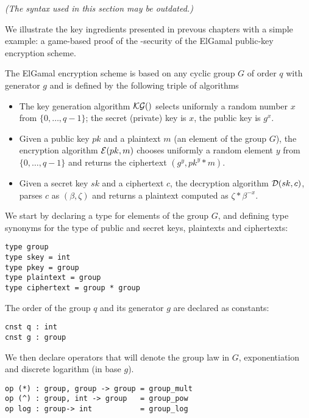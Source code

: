 \begin{flushright}
\it (The syntax used in this section may be outdated.)
\end{flushright}

We illustrate the key ingredients presented in prevous chapters with a
simple example: a game-based proof of the \INDCPA-security of the
ElGamal public-key encryption scheme.

The ElGamal encryption scheme is based on any cyclic group $G$ of
order $q$ with generator $g$ and is defined by the following triple of
algorithms

\begin{itemize} 
\item The key generation algorithm $\mathcal{KG}()$ selects uniformly a random
      number $x$ from $\{0,\ldots,q-1\}$; the secret (private) key is
      $x$, the public key is $g^x$.

\item Given a public key $pk$ and a plaintext $m$ (an element of the
      group $G$), the encryption algorithm $\mathcal{E}(pk, m)$ chooses
      uniformly a random element $y$ from $\{0,\ldots,q-1\}$ and
      returns the ciphertext $(g^y, pk^y * m)$.

\item Given a secret key $sk$ and a ciphertext $c$, 
      the decryption algorithm $\mathcal{D}(sk, c)$, parses $c$ as
      $(\beta,\zeta)$ and returns a plaintext computed as
      $\zeta * \beta^{-x}$.
\end{itemize}

We start by declaring a type for elements of the group $G$, and
defining type synonyms for the type of public and secret keys,
plaintexts and ciphertexts:
%
\begin{verbatim} 
type group 
type skey = int 
type pkey = group 
type plaintext = group 
type ciphertext = group * group 
\end{verbatim} 
%
The order of the group $q$ and its generator $g$ are declared as
constants:
%

\begin{verbatim}
cnst q : int
cnst g : group
\end{verbatim}

%
We then declare operators that will denote the group law in $G$,
exponentiation and discrete logarithm (in base $g$).
%
\begin{verbatim}
op (*) : group, group -> group = group_mult
op (^) : group, int -> group   = group_pow
op log : group-> int           = group_log
\end{verbatim}
%

